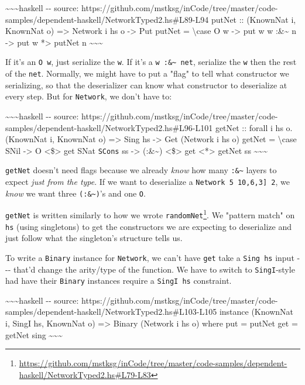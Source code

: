 \documentclass[]{article}
\renewcommand{\href}[2]{#2\footnote{\url{#1}}}
\begin{document}
\textasciitilde{}\textasciitilde{}\textasciitilde{}haskell -\/- source:
https://github.com/mstksg/inCode/tree/master/code-samples/dependent-haskell/NetworkTyped2.hs\#L89-L94
putNet :: (KnownNat i, KnownNat o) =\textgreater{} Network i hs o
-\textgreater{} Put putNet = \textbackslash{}case O w -\textgreater{} put w w
:\&\textasciitilde{} n -\textgreater{} put w *\textgreater{} putNet n
\textasciitilde{}\textasciitilde{}\textasciitilde{}

If it's an \texttt{O\ w}, just serialize the \texttt{w}. If it's a
\texttt{w\ :\&\textasciitilde{}\ net}, serialize the \texttt{w} then the rest of
the \texttt{net}. Normally, we might have to put a "flag" to tell what
constructor we serializing, so that the deserializer can know what constructor
to deserialize at every step. But for \texttt{Network}, we don't have to:

\textasciitilde{}\textasciitilde{}\textasciitilde{}haskell -\/- source:
https://github.com/mstksg/inCode/tree/master/code-samples/dependent-haskell/NetworkTyped2.hs\#L96-L101
getNet :: forall i hs o. (KnownNat i, KnownNat o) =\textgreater{} Sing hs
-\textgreater{} Get (Network i hs o) getNet = \textbackslash{}case SNil
-\textgreater{} O \textless{}\$\textgreater{} get SNat \texttt{SCons} ss
-\textgreater{} (:\&\textasciitilde{}) \textless{}\$\textgreater{} get
\textless{}*\textgreater{} getNet ss
\textasciitilde{}\textasciitilde{}\textasciitilde{}

\texttt{getNet} doesn't need flags because we already \emph{know} how many
\texttt{:\&\textasciitilde{}} layers to expect \emph{just from the type}. If we
want to deserialize a \texttt{Network\ 5\ \textquotesingle{}{[}10,6,3{]}\ 2}, we
\emph{know} we want three \texttt{(:\&\textasciitilde{})}'s and one \texttt{O}.

\texttt{getNet} is written similarly to how we wrote
\href{https://github.com/mstksg/inCode/tree/master/code-samples/dependent-haskell/NetworkTyped2.hs\#L79-L83}{\texttt{randomNet\textquotesingle{}}}.
We "pattern match" on \texttt{hs} (using singletons) to get the constructors we
are expecting to deserialize and just follow what the singleton's structure
tells us.

To write a \texttt{Binary} instance for \texttt{Network}, we can't have
\texttt{get} take a \texttt{Sing\ hs} input -\/-\/- that'd change the arity/type
of the function. We have to switch to \texttt{SingI}-style had have their
\texttt{Binary} instances require a \texttt{SingI\ hs} constraint.

\textasciitilde{}\textasciitilde{}\textasciitilde{}haskell -\/- source:
https://github.com/mstksg/inCode/tree/master/code-samples/dependent-haskell/NetworkTyped2.hs\#L103-L105
instance (KnownNat i, SingI hs, KnownNat o) =\textgreater{} Binary (Network i hs
o) where put = putNet get = getNet sing
\textasciitilde{}\textasciitilde{}\textasciitilde{}
\end{document}
